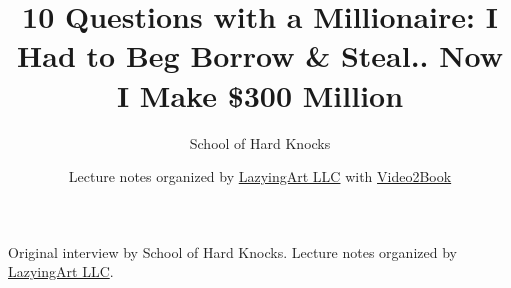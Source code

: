 \documentclass[11pt,oneside]{book}
\begin{document}
\frontmatter
\title{10 Questions with a Millionaire: I Had to Beg Borrow \& Steal.. Now I Make \$300 Million}
\author{School of Hard Knocks}
\date{Lecture notes organized by \href{https://lazying.art}{LazyingArt LLC} with \href{https://github.com/lachlanchen/Video2Book}{Video2Book}}
\maketitle
\begin{center}
\small Original interview by School of Hard Knocks. Lecture notes organized by \href{https://lazying.art}{LazyingArt LLC}.
\end{center}
\clearpage
\mainmatter

\end{document}
